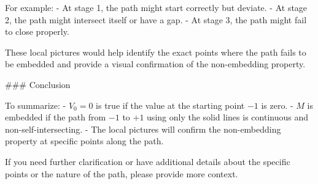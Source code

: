 For example:
- At stage 1, the path might start correctly but deviate.
- At stage 2, the path might intersect itself or have a gap.
- At stage 3, the path might fail to close properly.

These local pictures would help identify the exact points where the path fails to be embedded and provide a visual confirmation of the non-embedding property.

### Conclusion

To summarize:
- \( V_0 = 0 \) is true if the value at the starting point \(-1\) is zero.
- \( M \) is embedded if the path from \(-1\) to \(+1\) using only the solid lines is continuous and non-self-intersecting.
- The local pictures will confirm the non-embedding property at specific points along the path.

If you need further clarification or have additional details about the specific points or the nature of the path, please provide more context.